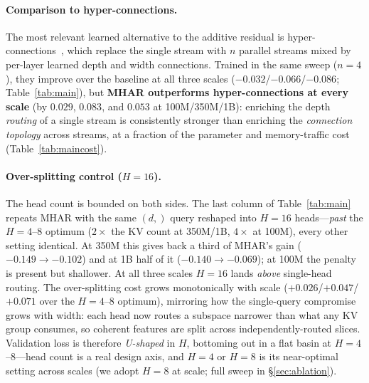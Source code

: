 \documentclass{article}
\begin{document}
\paragraph{Comparison to hyper-connections.} The most relevant learned alternative
to the additive residual is hyper-connections~\citep{zhu2024hyperconnections}, which
replace the single stream with $n$ parallel streams mixed by per-layer learned depth
and width connections. Trained in the same sweep ($n{=}4$), they improve over the
baseline at all three scales ($-0.032$/$-0.066$/$-0.086$; Table~\ref{tab:main}),
but \textbf{MHAR outperforms hyper-connections at every scale} (by $0.029$,
$0.083$, and $0.053$ at 100M/350M/1B): enriching the
depth \emph{routing} of a single stream is consistently stronger than enriching
the \emph{connection topology} across streams, at a fraction of the parameter
and memory-traffic cost (Table~\ref{tab:maincost}).

\paragraph{Over-splitting control ($H{=}16$).} The head count is bounded on
both sides. The last column of Table~\ref{tab:main} repeats MHAR with the same
$(d,)$ query reshaped into $H{=}16$ heads---\emph{past} the $H{=}4$--$8$ optimum
($2\times$ the KV count at 350M/1B, $4\times$ at 100M), every other setting identical.
At 350M this gives back a third of MHAR's gain ($-0.149\rightarrow-0.102$)
and at 1B half of it ($-0.140\rightarrow-0.069$); at 100M the penalty is
present but shallower. At all three scales $H{=}16$ lands \emph{above}
single-head routing. The
over-splitting cost grows monotonically with scale ($+0.026$/$+0.047$/$+0.071$
over the $H{=}4$--$8$ optimum), mirroring how the single-query compromise grows with width: each head now routes a
subspace narrower than what any KV group consumes, so coherent features are
split across independently-routed slices. Validation loss is therefore
\emph{U-shaped} in $H$, bottoming out in a flat basin at $H{=}4$--$8$---head
count is a real
design axis, and $H{=}4$ or $H{=}8$ is its near-optimal setting across scales
(we adopt $H{=}8$ at scale; full sweep in \S\ref{sec:ablation}).
\end{document}
